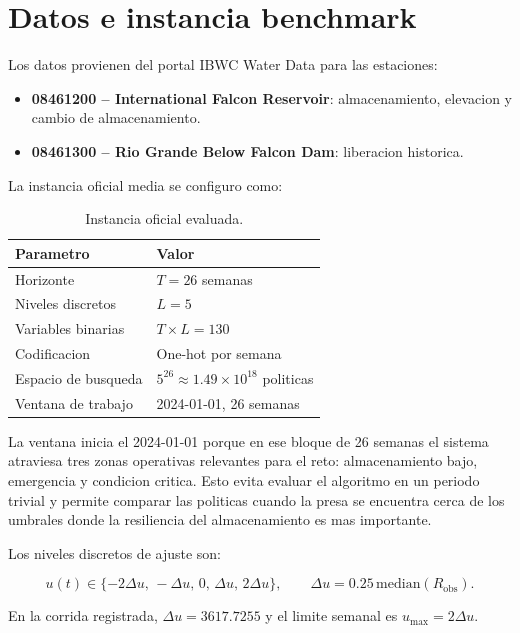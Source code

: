 \documentclass[11pt,letterpaper]{article}
\begin{document}
\section{Datos e instancia benchmark}

Los datos provienen del portal IBWC Water Data para las estaciones:

\begin{itemize}
  \item \textbf{08461200 -- International Falcon Reservoir}: almacenamiento,
  elevacion y cambio de almacenamiento.
  \item \textbf{08461300 -- Rio Grande Below Falcon Dam}: liberacion historica.
\end{itemize}

La instancia oficial media se configuro como:

\begin{table}[H]
\centering
\caption{Instancia oficial evaluada.}
\begin{tabular}{ll}
\toprule
Parametro & Valor \\
\midrule
Horizonte & $T=26$ semanas \\
Niveles discretos & $L=5$ \\
Variables binarias & $T\times L=130$ \\
Codificacion & One-hot por semana \\
Espacio de busqueda & $5^{26}\approx 1.49\times10^{18}$ politicas \\
Ventana de trabajo & 2024-01-01, 26 semanas \\
\bottomrule
\end{tabular}
\end{table}

La ventana inicia el 2024-01-01 porque en ese bloque de 26 semanas el sistema
atraviesa tres zonas operativas relevantes para el reto: almacenamiento bajo,
emergencia y condicion critica. Esto evita evaluar el algoritmo en un periodo
trivial y permite comparar las politicas cuando la presa se encuentra cerca de
los umbrales donde la resiliencia del almacenamiento es mas importante.

Los niveles discretos de ajuste son:

\begin{equation}
u(t) \in \{-2\Delta u,\,-\Delta u,\,0,\,\Delta u,\,2\Delta u\},
\qquad
\Delta u=0.25\,\mathrm{median}(R_{\mathrm{obs}}).
\end{equation}

En la corrida registrada, $\Delta u=3617.7255$ y el limite semanal es
$u_{\max}=2\Delta u$.
\end{document}
